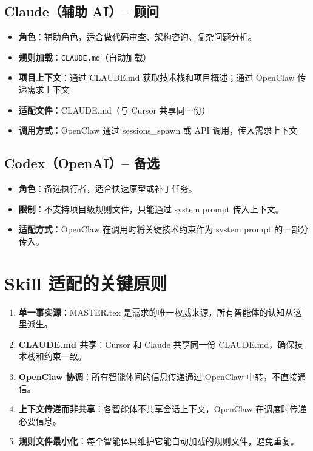 \documentclass[11pt,a4paper]{article}
\begin{document}
\subsection{Claude（辅助 AI）-- 顾问}

\begin{itemize}[nosep]
  \item \textbf{角色}：辅助角色，适合做代码审查、架构咨询、复杂问题分析。
  \item \textbf{规则加载}：\texttt{CLAUDE.md}（自动加载）
  \item \textbf{项目上下文}：通过 CLAUDE.md 获取技术栈和项目概述；通过 OpenClaw 传递需求上下文
  \item \textbf{适配文件}：CLAUDE.md（与 Cursor 共享同一份）
  \item \textbf{调用方式}：OpenClaw 通过 sessions\_spawn 或 API 调用，传入需求上下文
\end{itemize}

\subsection{Codex（OpenAI）-- 备选}

\begin{itemize}[nosep]
  \item \textbf{角色}：备选执行者，适合快速原型或补丁任务。
  \item \textbf{限制}：不支持项目级规则文件，只能通过 system prompt 传入上下文。
  \item \textbf{适配方式}：OpenClaw 在调用时将关键技术约束作为 system prompt 的一部分传入。
\end{itemize}

\section{Skill 适配的关键原则}

\begin{enumerate}
  \item \textbf{单一事实源}：MASTER.tex 是需求的唯一权威来源，所有智能体的认知从这里派生。
  \item \textbf{CLAUDE.md 共享}：Cursor 和 Claude 共享同一份 CLAUDE.md，确保技术栈和约束一致。
  \item \textbf{OpenClaw 协调}：所有智能体间的信息传递通过 OpenClaw 中转，不直接通信。
  \item \textbf{上下文传递而非共享}：各智能体不共享会话上下文，OpenClaw 在调度时传递必要信息。
  \item \textbf{规则文件最小化}：每个智能体只维护它能自动加载的规则文件，避免重复。
\end{enumerate}
\end{document}

